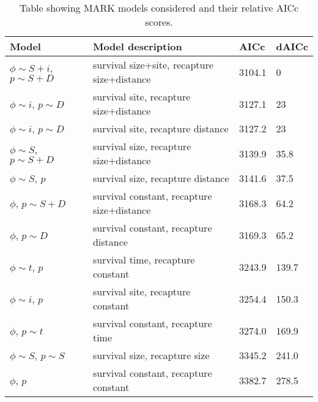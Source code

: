 \documentclass[12pt, oneside]{article}   	%
\begin{document}
\begin{table}[!htbp]
\begin{centering}
\caption{Table showing MARK models considered and their relative AICc scores.}\label{APP_TAB_MARKmodels}
\begin{tabular}{|p{2in}|p{2.5in}|p{0.75in}|p{0.75in}|}
\hline 
\textbf{Model} & \textbf{Model description} & \textbf{AICc} & \textbf{dAICc} \\ \hline
$\phi \sim S+i$, $p \sim S+D$ & survival size+site, recapture size+distance & 3104.1 & 0 \\ \hline
$\phi \sim i$, $p \sim D$ & survival site, recapture size+distance & 3127.1 & 23 \\ \hline
$\phi \sim i$, $p \sim D$ & survival site, recapture distance & 3127.2 & 23 \\ \hline
$\phi \sim S$, $p \sim S+D$ & survival size, recapture size+distance & 3139.9 & 35.8 \\ \hline
$\phi \sim S$, $p$ & survival size, recapture distance & 3141.6 & 37.5 \\ \hline
$\phi$, $p \sim S+D$ & survival constant, recapture size+distance & 3168.3 & 64.2 \\ \hline
$\phi$, $p \sim D$ & survival constant, recapture distance & 3169.3 & 65.2 \\ \hline
$\phi \sim t$, $p$ & survival time, recapture constant & 3243.9 & 139.7 \\ \hline
$\phi \sim i$, $p$ & survival site, recapture constant & 3254.4 & 150.3 \\ \hline
$\phi$, $p \sim t$ & survival constant, recapture time & 3274.0 & 169.9 \\ \hline
$\phi \sim S$, $p \sim S$ & survival size, recapture size & 3345.2 & 241.0 \\ \hline
$\phi$, $p$ & survival constant, recapture constant & 3382.7 & 278.5 \\ \hline
\end{tabular}
\end{centering}
\end{table}
\end{document}
